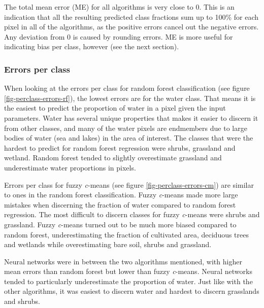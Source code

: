 \documentclass[a4paper,10pt]{book}
\begin{document}
The total mean error (ME) for all algorithms is very close to 0. This is an indication that all the resulting predicted class fractions sum up to 100\% for each pixel in all of the algorithms, as the positive errors cancel out the negative errors. Any deviation from 0 is caused by rounding errors. ME is more useful for indicating bias per class, however (see the next section).

\subsubsection{Errors per class}

When looking at the errors per class for random forest classification (see figure \ref{fig-perclass-errors-rf}), the lowest errors are for the water class. That means it is the easiest to predict the proportion of water in a pixel given the input parameters. Water has several unique properties that makes it easier to discern it from other classes, and many of the water pixels are endmembers due to large bodies of water (sea and lakes) in the area of interest. The classes that were the hardest to predict for random forest regression were shrubs, grassland and wetland. Random forest tended to slightly overestimate grassland and underestimate water proportions in pixels.

Errors per class for fuzzy \textit{c}-means (see figure \ref{fig-perclass-errors-cm}) are similar to ones in the random forest classification. Fuzzy \textit{c}-means made more large mistakes when discerning the fraction of water compared to random forest regression. The most difficult to discern classes for fuzzy \textit{c}-means were shrubs and grassland. Fuzzy \textit{c}-means turned out to be much more biased compared to random forest, underestimating the fraction of cultivated area, deciduous trees and wetlands while overestimating bare soil, shrubs and grassland.

Neural networks were in between the two algorithms mentioned, with higher mean errors than random forest but lower than fuzzy \textit{c}-means. Neural networks tended to particularly underestimate the proportion of water. Just like with the other algorithms, it was easiest to discern water and hardest to discern grasslands and shrubs.
\end{document}
